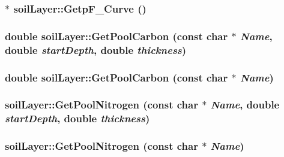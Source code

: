 \label{classsoil_layer_ab59162a095c3cc12c515b5e37f3b650a}
\hypertarget{classsoil_layer_a444bc7c75f30a1f722d044d7fe8f7033}{
\subsubsection[{GetpF\_\-Curve}]{$\ast$ soilLayer::GetpF\_\-Curve ()}}
\label{classsoil_layer_a444bc7c75f30a1f722d044d7fe8f7033}
\hypertarget{classsoil_layer_a80dfe52e3c2b3a2698f65658d9dd6c5e}{
\subsubsection[{GetPoolCarbon}]{\setlength{\rightskip}{0pt plus 5cm}double soilLayer::GetPoolCarbon (const char $\ast$ {\em Name}, \/  double {\em startDepth}, \/  double {\em thickness})}}
\label{classsoil_layer_a80dfe52e3c2b3a2698f65658d9dd6c5e}
\hypertarget{classsoil_layer_ad7a5ec5dc0f1ae8ffa47cfa94d55d552}{
\subsubsection[{GetPoolCarbon}]{\setlength{\rightskip}{0pt plus 5cm}double soilLayer::GetPoolCarbon (const char $\ast$ {\em Name})}}
\label{classsoil_layer_ad7a5ec5dc0f1ae8ffa47cfa94d55d552}
\hypertarget{classsoil_layer_aa3f614a875b5dbc8b8002f56595abb37}{
\subsubsection[{GetPoolNitrogen}]{ soilLayer::GetPoolNitrogen (const char $\ast$ {\em Name}, \/  double {\em startDepth}, \/  double {\em thickness})}}
\label{classsoil_layer_aa3f614a875b5dbc8b8002f56595abb37}
\hypertarget{classsoil_layer_ae96a8b15fed4200fee1a8001599e3c8d}{
\subsubsection[{GetPoolNitrogen}]{ soilLayer::GetPoolNitrogen (const char $\ast$ {\em Name})}}
